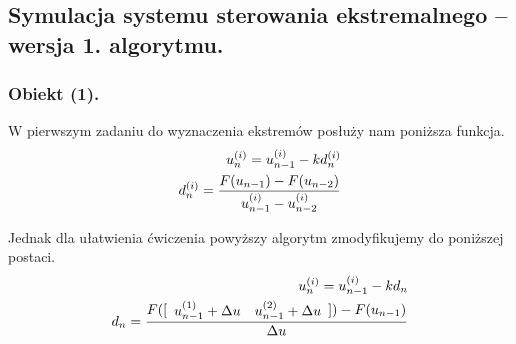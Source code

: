\documentclass[a4paper,10pt]{article}
\begin{document}
\subsection{Symulacja systemu sterowania ekstremalnego – wersja 1. algorytmu.}

\subsubsection{Obiekt (1).}
W pierwszym zadaniu do wyznaczenia ekstremów posłuży nam poniższa funkcja.
\begin{eqnarray}
	u_n^{(i)} = u_{n-1}^{(i)}-kd_n^{(i)}\\
	d_n^{(i)} = {F(u_{n-1}) - F(u_{n-2}) \over u_{n-1}^{(i)} - u_{n-2}^{(i)}}
\end{eqnarray}

Jednak dla ułatwienia ćwiczenia powyższy algorytm zmodyfikujemy do poniższej postaci.
\begin{eqnarray}
	u_n^{(i)} = u_{n-1}^{(i)}-kd_n\\
	d_n = {F([\begin{array}{ll} u_{n-1}^{(1)} + \Delta u & u_{n-1}^{(2)} + \Delta u\end{array}]) - F(u_{n-1}) \over \Delta u}
\end{eqnarray}
\end{document}
